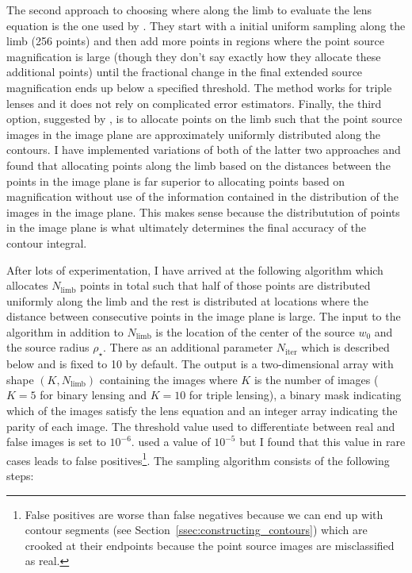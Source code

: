 \documentclass[12pt,dvipsnames]{report}
\begin{document}
The second approach to choosing where along the limb to evaluate the lens equation is the 
one used by \citet{2021MNRAS.503.6143K}. They start with a initial uniform sampling along the limb 
(256 points) and then add more points in regions where the point source magnification is large 
(though they don't say exactly how they allocate these additional points) until the fractional 
change in the final extended source magnification ends up below a specified threshold. 
The method works for triple lenses and it does not rely on complicated error estimators.
Finally, the third option, suggested by \citet{1997ApJ...477..580G}, is to allocate points 
on the limb such that the point source images in the image plane are approximately uniformly 
distributed along  the contours. I have implemented variations of both of the latter two
approaches  and found that allocating points along the limb based on the distances 
between the points in the image plane is far superior to allocating points based on magnification
without use of the information contained in the distribution of the images in the image plane.
This makes sense because the distributution of points in the image 
plane is what ultimately determines the final accuracy of the contour integral.

After lots of experimentation, I have arrived at the following algorithm which allocates
$N_\mathrm{limb}$ points in total such that half of those points are distributed uniformly 
along the limb and the rest is distributed at locations where the distance between consecutive 
points in the image plane is large. The input to the algorithm in addition to $N_\mathrm{limb}$
is the location of the center of the source $w_0$ and the source radius $\rho_\star$. There 
as an additional parameter $N_\mathrm{iter}$ which is described below and is fixed to 10 by 
default. The output is a two-dimensional array with shape $(K, N_\mathrm{limb})$ containing the 
images where $K$ is the number of images ($K=5$ for binary lensing and $K=10$ for triple lensing), 
a binary mask indicating which of the images satisfy the lens equation and an integer array 
indicating the parity of each image. The threshold value used to differentiate between 
real and false images is set to $10^{-6}$. \citet{2021MNRAS.503.6143K} used a value of 
$10^{-5}$ but I found that this value in rare cases leads to false positives\footnote{False 
positives are worse than false negatives because we can end up with contour segments (see
Section~\ref{ssec:constructing_contours}) which are crooked at their endpoints because 
the point source images are misclassified as real.}. 
The sampling algorithm consists of the following steps:
\end{document}
